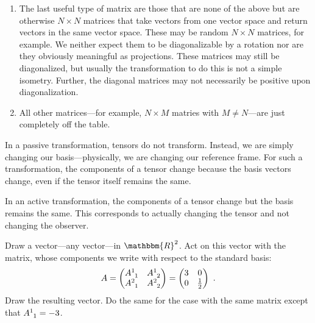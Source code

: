 \documentclass[12pt, oneside]{report}    %
\begin{document}
\begin{enumerate}
    \item The last useful type of matrix are those that are none of the above but are otherwise $N\times N$ matrices that take vectors from one vector space and return vectors in the same vector space. These may be random $N\times N$ matrices, for example. We neither expect them to be diagonalizable by a rotation nor are they obviously meaningful as projections. These matrices may still be diagonalized, but usually the transformation to do this is not a simple isometry. Further, the diagonal matrices may not necessarily be positive upon diagonalization.
    \item All other matrices---for example, $N\times M$ matries with $M\neq N$---are just completely off the table. 
\end{enumerate}

\begin{example} In a passive transformation, tensors do not transform. Instead, we are simply changing our basis---physically, we are changing our reference frame. For such a transformation, the components of a tensor change because the basis vectors change, even if the tensor itself remains the same. 

In an active transformation, the components of a tensor change but the basis remains the same. This corresponds to actually changing the tensor and not changing the observer.
\end{example}

\begin{exercise}
Draw a vector---any vector---in $\mathbbm{R}^2$. Act on this vector with the matrix, whose components we write with respect to the standard basis:
\begin{align}
    A = \begin{pmatrix}
        A\aij{1}{1} & A\aij{1}{2}\\
        A\aij{2}{1} & A\aij{2}{2}
    \end{pmatrix}
    =
    \begin{pmatrix}
        3 & 0\\
        0 & \frac{1}{2}
    \end{pmatrix} \ .
\end{align}
Draw the resulting vector. Do the same for the case with the same matrix except that $A\aij{1}{1} = -3$.
\end{exercise}


\end{document}
